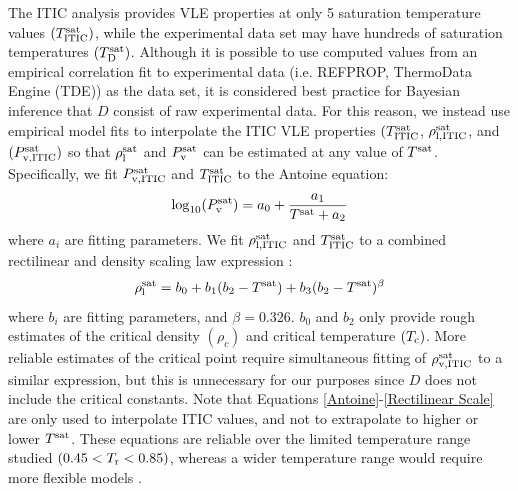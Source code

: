 \documentclass[preprint,letterpaper,floatfix,citeautoscript,aip,jcp]{revtex4-1}
\begin{document}
The ITIC analysis provides VLE properties at only 5 saturation temperature values $(T^{\rm sat}_{\rm ITIC})$, while the experimental data set may have hundreds of saturation temperatures $(T^{\rm sat}_{\rm D})$. Although it is possible to use computed values from an empirical correlation fit to experimental data (i.e. REFPROP, ThermoData Engine (TDE)) as the data set, it is considered best practice for Bayesian inference that $D$ consist of raw experimental data.
For this reason, we instead use empirical model fits to interpolate the ITIC VLE properties $(T^{\rm sat}_{\rm ITIC}$, $\rho_{\rm l, ITIC}^{\rm sat}$, and $(P_{\rm v, ITIC}^{\rm sat})$ so that $\rho_{\rm l}^{\rm sat}$ and $P_{\rm v}^{\rm sat}$ can be estimated at any value of $T^{\rm sat}$. Specifically, we fit $P_{\rm v, ITIC}^{\rm sat}$ and $T^{\rm sat}_{\rm ITIC}$ to the Antoine equation:
\begin{equation} \label{Antoine}
\log_{\rm 10}(P_{\rm v}^{\rm sat}) = a_0 + \frac{a_1}{T^{\rm sat} + a_2}
\end{equation}
where $a_i$ are fitting parameters.
We fit $\rho_{\rm l, ITIC}^{\rm sat}$ and $T^{\rm sat}_{\rm ITIC}$ to a combined rectilinear and density scaling law expression \cite{Mess4}:
\begin{equation} \label{Rectilinear Scale}
\rho_{\rm l}^{\rm sat} = b_0 + b_1 (b_2 - T^{\rm sat}) + b_3 (b_2 - T^{\rm sat}) ^ {\beta}
\end{equation}
where $b_i$ are fitting parameters, and $\beta = 0.326$. $b_0$ and $b_2$ only provide rough estimates of the critical density $(\rho_c)$ and critical temperature $(T_{\rm c})$. More reliable estimates of the critical point require simultaneous fitting of $\rho_{\rm v, ITIC}^{\rm sat}$ to a similar expression, but this is unnecessary for our purposes since $D$ does not include the critical constants. Note that Equations \ref{Antoine}-\ref{Rectilinear Scale} are only used to interpolate ITIC values, and not to extrapolate to higher or lower $T^{\rm sat}$. These equations are reliable over the limited temperature range studied $(0.45 < T_{\rm r} < 0.85)$, whereas a wider temperature range would require more flexible models \cite{Riedel,Funke}. 
\end{document}
